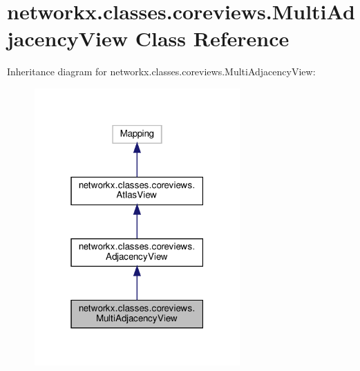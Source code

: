 \hypertarget{classnetworkx_1_1classes_1_1coreviews_1_1MultiAdjacencyView}{}\section{networkx.\+classes.\+coreviews.\+Multi\+Adjacency\+View Class Reference}
\label{classnetworkx_1_1classes_1_1coreviews_1_1MultiAdjacencyView}


Inheritance diagram for networkx.\+classes.\+coreviews.\+Multi\+Adjacency\+View\+:
\nopagebreak
\begin{figure}[H]
\begin{center}
\leavevmode
\includegraphics[width=223pt]{classnetworkx_1_1classes_1_1coreviews_1_1MultiAdjacencyView__inherit__graph}
\end{center}
\end{figure}



